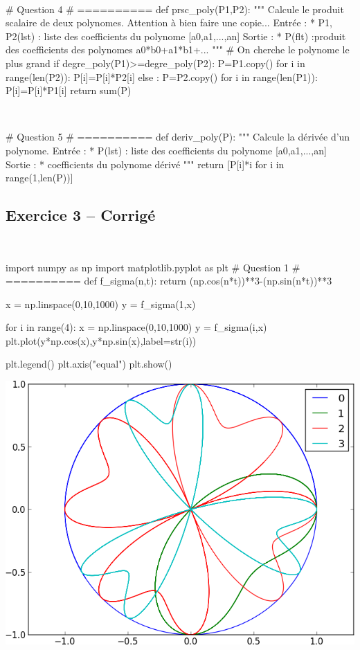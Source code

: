 \documentclass[10pt,fleqn]{article} %
\begin{document}
\begin{corrige}
$\quad$
\begin{python}
# Question 4
# ==========
def prsc_poly(P1,P2):
    """
    Calcule le produit scalaire de deux polynomes.
    Attention à bien faire une copie...
    Entrée : 
     * P1, P2(lst) : liste des coefficients du 
       polynome [a0,a1,...,an]
    Sortie : 
     * P(flt) :produit des coefficients des 
        polynomes a0*b0+a1*b1+...
    """
     # On cherche le polynome le plus grand
    if degre_poly(P1)>=degre_poly(P2):
        P=P1.copy()
        for i in range(len(P2)):
            P[i]=P[i]*P2[i]
    else :
        P=P2.copy()
        for i in range(len(P1)):
            P[i]=P[i]*P1[i]
    return sum(P)
\end{python}
\end{corrige}

\begin{corrige}
$\quad$
\begin{python}
# Question 5
# ==========
def deriv_poly(P):
    """
    Calcule la dérivée d'un polynome.
    Entrée : 
     * P(lst) : liste des coefficients du 
        polynome [a0,a1,...,an]
    Sortie : 
     * coefficients du polynome dérivé
    """
    return [P[i]*i for i in range(1,len(P))]
\end{python}
\end{corrige}




{}
\subsection*{Exercice 3 -- Corrigé}

\begin{corrige}
$\quad$
\begin{python}
import numpy as np
import matplotlib.pyplot as plt
# Question 1 
# ==========
def f_sigma(n,t):
    return (np.cos(n*t))**3-(np.sin(n*t))**3

x = np.linspace(0,10,1000)
y = f_sigma(1,x)

for i in range(4):
    x = np.linspace(0,10,1000)
    y = f_sigma(i,x)
    plt.plot(y*np.cos(x),y*np.sin(x),label=str(i))

plt.legend()
plt.axis("equal")    
plt.show()
\end{python}
\end{corrige}
\begin{center}
\includegraphics[width=.4\linewidth]{images/exo_FB_03}
\end{center}
\end{document}
